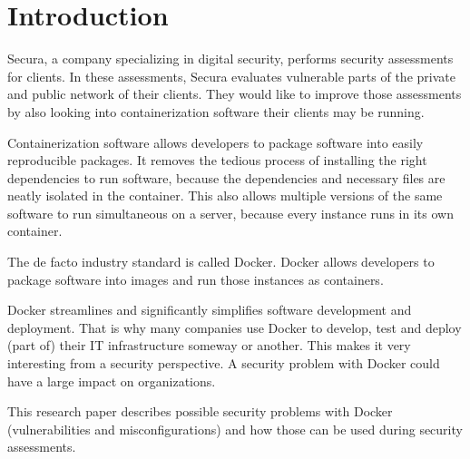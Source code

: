 \chapter{Introduction}


Secura, a company specializing in digital security, performs security assessments for clients. In these assessments, Secura evaluates vulnerable parts of the private and public network of their clients. They would like to improve those assessments by also looking into containerization software their clients may be running.

\hfill

Containerization software allows developers to package software into easily reproducible packages.
It removes the tedious process of installing the right dependencies to run software, because the dependencies and necessary files are neatly isolated in the container. This also allows multiple versions of the same software to run simultaneous on a server, because every instance runs in its own container.

The de facto industry standard is called Docker. Docker allows developers to package software into images and run those instances as containers.

Docker streamlines and significantly simplifies software development and deployment. That is why many companies use Docker to develop, test and deploy (part of) their IT infrastructure someway or another. This makes it very interesting from a security perspective. A security problem with Docker could have a large impact on organizations.

\hfill

This research paper describes possible security problems with Docker (vulnerabilities and misconfigurations) and how those can be used during security assessments.
